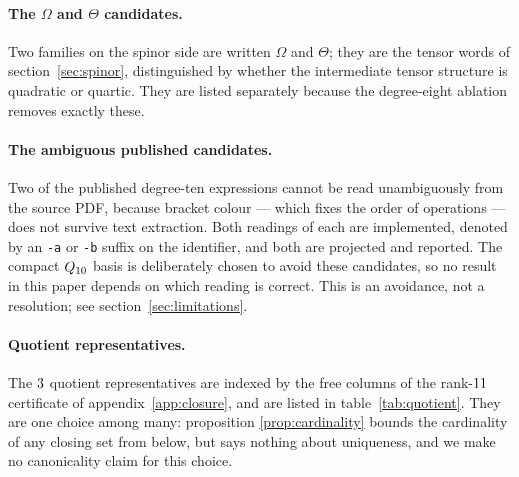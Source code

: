\paragraph{The $\Omega$ and $\Theta$ candidates.}
Two families on the spinor side are written $\Omega$ and $\Theta$; they are the
tensor words of section~\ref{sec:spinor}, distinguished by whether the
intermediate tensor structure is quadratic or quartic. They are listed
separately because the degree-eight ablation removes exactly these.

\paragraph{The ambiguous published candidates.}
Two of the published degree-ten expressions cannot be read unambiguously from the
source PDF, because bracket colour --- which fixes the order of operations ---
does not survive text extraction. Both readings of each are implemented, denoted
by an \texttt{-a} or \texttt{-b} suffix on the identifier, and both are projected
and reported. The compact $Q_{10}$ basis is deliberately chosen to avoid these
candidates, so no result in this paper depends on which reading is correct. This
is an avoidance, not a resolution; see section~\ref{sec:limitations}.

\paragraph{Quotient representatives.}
The $3$ quotient representatives are indexed by the free columns of the
rank-$11$ certificate of appendix~\ref{app:closure}, and are listed in
table~\ref{tab:quotient}. They are one choice among many: proposition
\ref{prop:cardinality} bounds the cardinality of any closing set from below, but
says nothing about uniqueness, and we make no canonicality claim for this choice.
